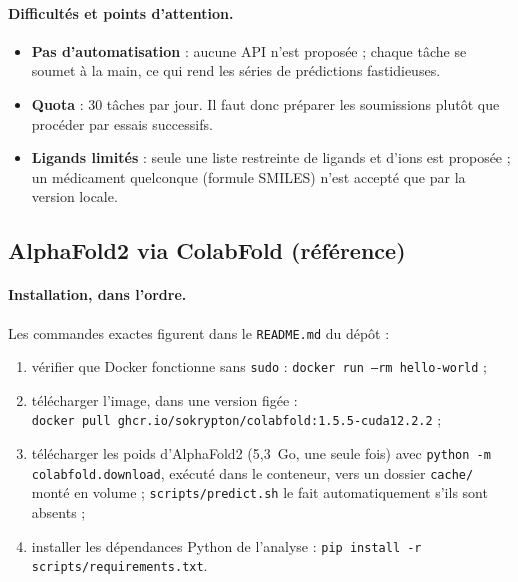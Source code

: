 \paragraph{Difficultés et points d'attention.}
\begin{itemize}
  \item \textbf{Pas d'automatisation} : aucune API n'est proposée ; chaque tâche se soumet à la main, ce qui rend les séries de prédictions fastidieuses.
  \item \textbf{Quota} : 30 tâches par jour. Il faut donc préparer les soumissions plutôt que procéder par essais successifs.
  \item \textbf{Ligands limités} : seule une liste restreinte de ligands et d'ions est proposée ; un médicament quelconque (formule SMILES) n'est accepté que par la version locale.
\end{itemize}

\subsection{AlphaFold2 via ColabFold (référence)}

\paragraph{Installation, dans l'ordre.} Les commandes exactes figurent dans le \texttt{README.md} du dépôt :
\begin{enumerate}
  \item vérifier que Docker fonctionne sans \texttt{sudo} : \texttt{docker run --rm hello-world} ;
  \item télécharger l'image, dans une version figée :\\
  \texttt{docker pull ghcr.io/sokrypton/colabfold:1.5.5-cuda12.2.2} ;
  \item télécharger les poids d'AlphaFold2 (5,3~Go, une seule fois) avec \texttt{python -m colabfold.download}, exécuté dans le conteneur, vers un dossier \texttt{cache/} monté en volume ; \texttt{scripts/predict.sh} le fait automatiquement s'ils sont absents ;
  \item installer les dépendances Python de l'analyse : \texttt{pip install -r scripts/requirements.txt}.
\end{enumerate}

